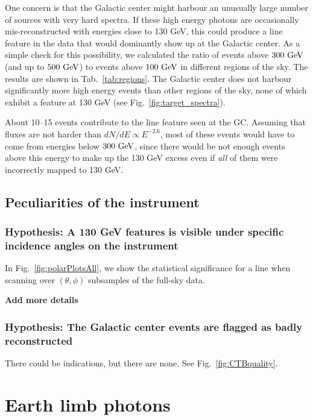 \documentclass[aps,twocolumn,prd,superscriptaddress,showpacs,nofootinbib,fixfloat]{revtex4}
\newcommand{\GeV}{{\rm ~GeV}}
\begin{document}
One concern is that the Galactic center might harbour an
unusually large number of sources with very hard spectra. If
these high energy photons are occasionally mis-reconstructed
with energies close to 130 GeV, this could produce a line
feature in the data that would dominantly show up at the
Galactic center. As a simple check for this possibility, we
calculated the ratio of events above $300\GeV$ (and up to
$500\GeV$) to events above $100\GeV$ in different regions of
the sky. The results are shown in
Tab.~\ref{tab:regions}.  The Galactic center does not
harbour significantly more high energy events than other
regions of the sky, none of which exhibit a feature at 130
GeV (see Fig.~\ref{fig:target_spectra}).

About 10--15 events contribute to the line feature seen at the GC. Assuming
that fluxes are not harder than $dN/dE \propto E^{-2.6}$, most of these events
would
have to come from energies below $300\GeV$, since there would be not enough
events above this energy to make up the 130 GeV excess even if \emph{all} of
them were incorrectly mapped to 130 GeV. 



\subsection{Peculiarities of the instrument}

\subsubsection{Hypothesis: A 130 GeV features is visible under specific
incidence angles on the instrument}

In Fig.~\ref{fig:polarPlotsAll}, we show the statistical significance for a
line when scanning over $(\theta, \phi)$ subsamples of the full-sky data.

\textbf{Add more details}

\subsubsection{Hypothesis: The Galactic center events are flagged as badly
reconstructed}

There could be indications, but there are none. See Fig.~\ref{fig:CTBquality}.
\text



\section{Earth limb photons}
\end{document}
